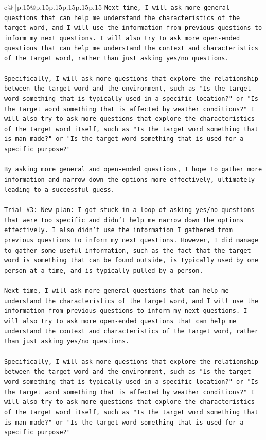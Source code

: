 \documentclass{article}
\begin{document}
{\begin{supertabular}{c@{$\;$}|p{.15\linewidth}@{}p{.15\linewidth}p{.15\linewidth}p{.15\linewidth}p{.15\linewidth}p{.15\linewidth}}
{{{\texttt{Next time, I will ask more general questions that can help me understand the characteristics of the target word, and I will use the information from previous questions to inform my next questions. I will also try to ask more open{-}ended questions that can help me understand the context and characteristics of the target word, rather than just asking yes/no questions. } \\
\\ 
\texttt{Specifically, I will ask more questions that explore the relationship between the target word and the environment, such as "Is the target word something that is typically used in a specific location?" or "Is the target word something that is affected by weather conditions?" I will also try to ask more questions that explore the characteristics of the target word itself, such as "Is the target word something that is man{-}made?" or "Is the target word something that is used for a specific purpose?" } \\
\\ 
\texttt{By asking more general and open{-}ended questions, I hope to gather more information and narrow down the options more effectively, ultimately leading to a successful guess.} \\
\\ 
\texttt{Trial \#3: New plan: I got stuck in a loop of asking yes/no questions that were too specific and didn't help me narrow down the options effectively. I also didn't use the information I gathered from previous questions to inform my next questions. However, I did manage to gather some useful information, such as the fact that the target word is something that can be found outside, is typically used by one person at a time, and is typically pulled by a person. } \\
\\ 
\texttt{Next time, I will ask more general questions that can help me understand the characteristics of the target word, and I will use the information from previous questions to inform my next questions. I will also try to ask more open{-}ended questions that can help me understand the context and characteristics of the target word, rather than just asking yes/no questions. } \\
\\ 
\texttt{Specifically, I will ask more questions that explore the relationship between the target word and the environment, such as "Is the target word something that is typically used in a specific location?" or "Is the target word something that is affected by weather conditions?" I will also try to ask more questions that explore the characteristics of the target word itself, such as "Is the target word something that is man{-}made?" or "Is the target word something that is used for a specific purpose?" } \\
}}}
\end{supertabular}}
\end{document}
